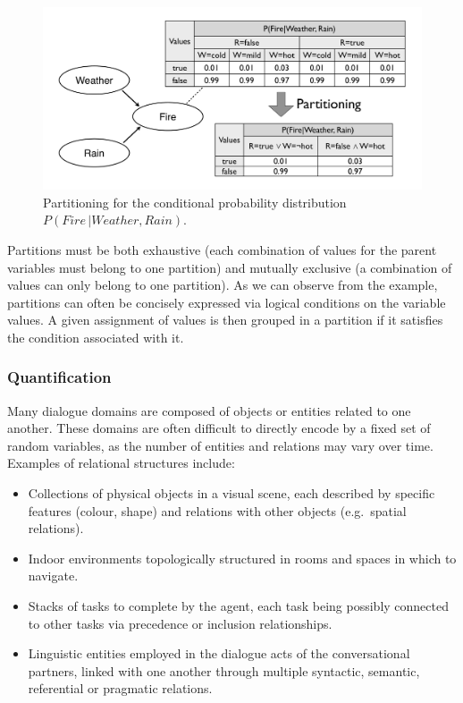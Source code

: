

 \begin{figure}[h]
\centering
\includegraphics[scale=0.25]{imgs/partitioning.pdf}
\caption{Partitioning for the conditional probability distribution $P(\mathit{Fire} \, | \mathit{Weather}, \mathit{Rain})$.}
\label{fig:partitioning}
\end{figure}

Partitions must be both exhaustive (each combination of values for the parent variables must belong to one partition) and mutually exclusive (a combination of values can only belong to one partition).  As we can observe from the example, partitions can often be concisely expressed via logical conditions on the variable values.  A given assignment of values is then grouped in a partition if it satisfies the condition associated with it.

\subsubsection*{Quantification}

Many dialogue domains are composed of objects or entities related to one another. These domains are often difficult to directly encode by a fixed set of random variables, as the number of entities and relations may vary over time.  Examples of relational structures include: 
\begin{itemize}
\item Collections of physical objects in a visual scene, each described by specific features (colour, shape) and relations with other objects (e.g.\ spatial relations).
\item Indoor environments topologically structured in rooms and spaces in which to navigate. 
\item Stacks of tasks to complete by the agent, each task being possibly connected to other tasks via precedence or inclusion relationships.
\item Linguistic entities employed in the dialogue acts of the conversational partners, linked with one another through multiple syntactic, semantic, referential or pragmatic relations. 
\end{itemize}

